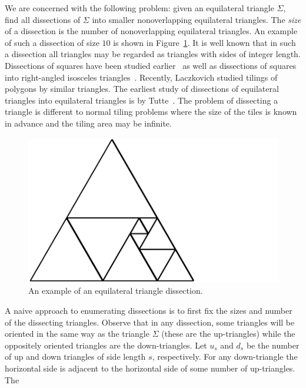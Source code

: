 \documentclass[12pt,amstags,fleqn]{article}
\theoremstyle{plain}
\theoremstyle{definition}
\begin{document}
We are concerned with the following problem: given an equilateral
triangle $\Sigma$, find all dissections of $\Sigma$ into smaller
nonoverlapping equilateral triangles. The {\em size} of a dissection is
the number of nonoverlapping equilateral triangles. An example of such a dissection
of size $10$ is shown in Figure~\ref{exDissection}. 
It is well known that in such a dissection all triangles may be
regarded as triangles with sides of integer length.
Dissections of squares have been studied earlier~\cite{MR0003040}
as well as dissections of squares into right-angled isosceles
triangles~\cite{MR1794696}. Recently, 
Laczkovich\cite{MR1092545} studied tilings of polygons by similar
triangles. The earliest study of dissections of equilateral triangles
into equilateral triangles is by Tutte~\cite{MR0027521}. The problem of
dissecting a triangle is
different to normal tiling problems where the size of the tiles is known
in advance and the tiling area may be infinite.
\begin{figure}[hbt]
\begin{center}
\includegraphics{dissection10_i19_r3_c1.pdf}
\end{center}
\caption{An example of an equilateral triangle dissection.}
\label{exDissection}
\end{figure}
A naive approach to enumerating dissections is to first fix the sizes and
number of
the dissecting triangles. Observe that in any dissection, some triangles
will be oriented in the same way as the triangle $\Sigma$ (these are the
up-triangles) while the oppositely oriented triangles are the down-triangles.
Let $u_{s}$ and $d_{s}$ be the number of up and down triangles of side
length $s$, respectively. For any down-triangle the horizontal side is
adjacent to the horizontal side of some number of up-triangles. The
\end{document}
